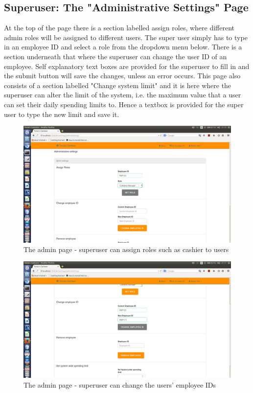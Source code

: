 \documentclass[a4paper,12pt]{report}
\begin{document}
\subsection{Superuser: The "Administrative Settings" Page} 
At the top of the page there is a section labelled assign roles, where different admin roles will be assigned to different users. The super user simply has to type in an employee ID and select a role from the dropdown menu below. There is a section underneath that where the superuser can change the user ID of an employee. Self explanatory text boxes are provided for the superuser to fill in and the submit button will save the changes, unless an error occurs.  This page also consists of a section labelled "Change system limit" and it is here where the superuser can alter the limit of the system, i.e. the maximum value that a user can set their daily spending limits to. Hence a textbox is provided for the super user to type the new limit and save it.

\begin{figure}[H]
  \centering
    \includegraphics[width=1.0\textwidth]{screenshots/assignRole.png}
    \caption{The admin page - superuser can assign roles such as cashier to users} 
\end{figure}

\begin{figure}[H]
  \centering
    \includegraphics[width=1.0\textwidth]{screenshots/changeEmplid.png}
    \caption{The admin page - superuser can change the users' employee IDs} 
\end{figure}
\end{document}
